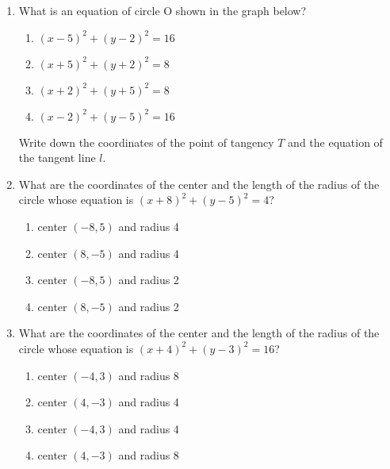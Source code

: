 \begin{enumerate}
\item What is an equation of circle O shown in the graph below?
  \begin{center}
  \end{center}
  \begin{multicols}{2}
    \begin{enumerate}
      \item $(x-5)^2+(y-2)^2=16$
      \item $(x+5)^2+(y+2)^2=8$
      \item $(x+2)^2+(y+5)^2=8$
      \item $(x-2)^2+(y-5)^2=16$
    \end{enumerate}
  \end{multicols}
  Write down the coordinates of the point of tangency $T$ and the equation of the tangent line $l$.

\item What are the coordinates of the center and the length of the radius of the circle whose equation is $(x+8)^2+(y-5)^2=4$?
  \begin{enumerate}[itemsep=0.25cm]
    \item center $(-8,5)$ and radius 4
    \item center $(8,-5)$ and radius 4
    \item center $(-8,5)$ and radius 2
    \item center $(8,-5)$ and radius 2
  \end{enumerate}

\item What are the coordinates of the center and the length of the radius of the circle whose equation is $(x+4)^2+(y-3)^2=16$?
    \begin{enumerate}
      \item center $(-4,3)$ and radius 8
      \item center $(4,-3)$ and radius 4
      \item center $(-4,3)$ and radius 4
      \item center $(4,-3)$ and radius 8
    \end{enumerate}


\end{enumerate}
